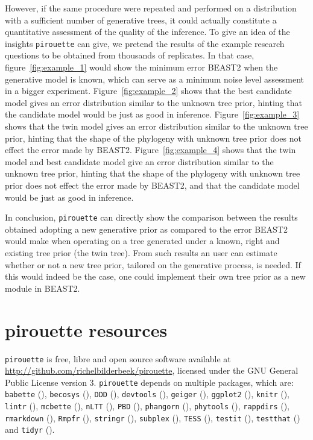 \documentclass{article}
\begin{document}
However, if the same procedure were repeated and performed on a distribution 
with a sufficient number of generative trees, 
it could actually constitute a quantitative assessment 
of the quality of the inference.
To give an idea of the insights \verb;pirouette; can give,
we pretend the results of the example research questions
to be obtained from thousands of replicates.
In that case, figure~\ref{fig:example_1} would show 
the minimum error BEAST2 when the
generative model is known, which can serve as 
a minimum noise level assessment in a bigger experiment.  
Figure~\ref{fig:example_2} shows that 
the best candidate model gives an error distribution similar to the unknown 
tree prior,
hinting that the candidate model would be just as good in inference.
Figure~\ref{fig:example_3} shows that 
the twin model gives an error distribution similar to the unknown tree prior,
hinting that the shape of the phylogeny with unknown tree prior
does not effect the error made by BEAST2.
Figure~\ref{fig:example_4} shows that 
the twin model and best candidate model give 
an error distribution similar to the unknown tree prior,
hinting that the shape of the phylogeny with unknown tree prior
does not effect the error made by BEAST2, 
and that the candidate model would be just as good in inference.

In conclusion, \verb;pirouette; can directly show 
the comparison between the results obtained 
adopting a new generative prior as compared to the error BEAST2 
would make when operating on a tree generated 
under a known, right and existing tree prior (the twin tree).
From such results an user can estimate whether or not a new tree prior, 
tailored on the generative process, is needed. 
If this would indeed be the case, 
one could implement their own tree prior as a new module in BEAST2.

\section{pirouette resources}

\verb;pirouette; is free, libre and open source software available at 
\url{http://github.com/richelbilderbeek/pirouette},
licensed under the GNU General Public License version 3.
\verb;pirouette; depends on multiple packages, which are:
\verb;babette; (\cite{bilderbeek2018babette}),
\verb;becosys; (\cite{becosys}),
\verb;DDD; (\cite{DDD}),
\verb;devtools; (\cite{devtools}),
\verb;geiger; (\cite{geiger}),
\verb;ggplot2; (\cite{ggplot2}),
\verb;knitr; (\cite{knitr}),
\verb;lintr; (\cite{lintr}),
\verb;mcbette; (\cite{mcbette}),
\verb;nLTT; (\cite{nLTT}),
\verb;PBD; (\cite{PBD}),
\verb;phangorn; (\cite{phangorn}),
\verb;phytools; (\cite{phytools}),
\verb;rappdirs; (\cite{rappdirs}),
\verb;rmarkdown; (\cite{rmarkdown}),
\verb;Rmpfr; (\cite{Rmpfr}),
\verb;stringr; (\cite{stringr}),
\verb;subplex; (\cite{subplex}),
\verb;TESS; (\cite{TESS}),
\verb;testit; (\cite{testit}), 
\verb;testthat; (\cite{testthat}) and
\verb;tidyr; (\cite{tidyr}).
\end{document}

